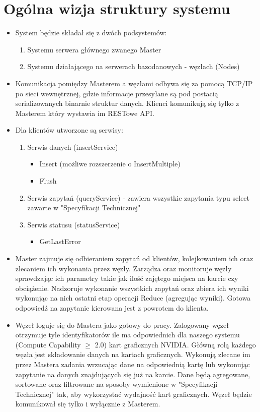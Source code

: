 \documentclass[paper=a4, fontsize=11pt]{scrartcl} %
\numberwithin{equation}{section} %
\numberwithin{figure}{section} %
\numberwithin{table}{section} %
\begin{document}
\section{Ogólna wizja struktury systemu}
\begin{itemize}
	\item System będzie składał się z dwóch podsystemów:
		\begin{enumerate}
			\item Systemu serwera głównego zwanego Master
			\item Systemu działającego na serwerach bazodanowych - węzłach (Nodes)
		\end{enumerate}
	\item Komunikacja pomiędzy Masterem a węzłami odbywa się za pomocą TCP/IP po sieci wewnętrznej, gdzie informacje przesyłane są pod postacią
		serializowanych binarnie struktur danych. Klienci komunikują się tylko z Masterem który wystawia im RESTowe API. 
	\item Dla klientów utworzone są serwisy:
		\begin{enumerate}
			\item Serwis danych (insertService)
				\begin{itemize}
					\item Insert (możliwe rozszerzenie o InsertMultiple)
					\item Flush
				\end{itemize}
			\item Serwis zapytań (queryService) - zawiera wszystkie zapytania typu select zawarte w "Specyfikacji Technicznej"
			\item Serwis statusu (statusService)
				\begin{itemize}
					\item GetLastError
				\end{itemize}
		\end{enumerate}
	\item Master zajmuje się odbieraniem zapytań od klientów, kolejkowaniem ich oraz zlecaniem ich wykonania przez węzły. Zarządza oraz monitoruje 
		węzły sprawdzając ich parametry takie jak ilość zajętego miejsca na karcie czy obciążenie. Nadzoruje wykonanie wszystkich zapytań oraz zbiera ich wyniki 
		wykonując na nich ostatni etap operacji Reduce (agregując wyniki). Gotowa odpowiedź na zapytanie kierowana jest z powrotem do klienta.
	\item Węzeł loguje się do Mastera jako gotowy do pracy. Zalogowany węzeł otrzymuje tyle identyfikatorów ile ma odpowiednich dla naszego systemu 
		(Compute Capability $\geq$ 2.0) kart graficznych NVIDIA. Główną rolą każdego węzła jest składowanie danych na kartach graficznych. Wykonują zlecane im przez Mastera
		zadania wrzucając dane na odpowiednią kartę lub wykonując zapytanie na danych znajdujących się już na karcie. Dane będą agregowane, sortowane oraz filtrowane na sposoby wymienione w "Specyfikacji Technicznej" tak, aby wykorzystać wydajność kart graficznych. Węzeł będzie komunikował się tylko i wyłącznie z Masterem.
\end{itemize}
\end{document}
